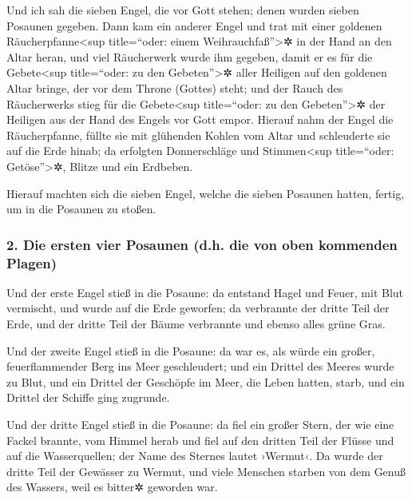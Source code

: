  Und ich sah die sieben Engel, die vor Gott stehen; denen
wurden sieben Posaunen gegeben.  Dann kam ein anderer
Engel und trat mit einer goldenen Räucherpfanne\textless sup
title=``oder: einem Weihrauchfaß''\textgreater✲ in der Hand an den Altar
heran, und viel Räucherwerk wurde ihm gegeben, damit er es für die
Gebete\textless sup title=``oder: zu den Gebeten''\textgreater✲ aller
Heiligen auf den goldenen Altar bringe, der vor dem Throne (Gottes)
steht;  und der Rauch des Räucherwerks stieg für die
Gebete\textless sup title=``oder: zu den Gebeten''\textgreater✲ der
Heiligen aus der Hand des Engels vor Gott empor.  Hierauf
nahm der Engel die Räucherpfanne, füllte sie mit glühenden Kohlen vom
Altar und schleuderte sie auf die Erde hinab; da erfolgten Donnerschläge
und Stimmen\textless sup title=``oder: Getöse''\textgreater✲, Blitze und
ein Erdbeben.

 Hierauf machten sich die sieben Engel, welche die sieben
Posaunen hatten, fertig, um in die Posaunen zu stoßen.

\hypertarget{die-ersten-vier-posaunen-d.h.-die-von-oben-kommenden-plagen}{%
\subsubsection{2. Die ersten vier Posaunen (d.h. die von oben kommenden
Plagen)}\label{die-ersten-vier-posaunen-d.h.-die-von-oben-kommenden-plagen}}

 Und der erste Engel stieß in die Posaune: da entstand
Hagel und Feuer, mit Blut vermischt, und wurde auf die Erde geworfen; da
verbrannte der dritte Teil der Erde, und der dritte Teil der Bäume
verbrannte und ebenso alles grüne Gras.

 Und der zweite Engel stieß in die Posaune: da war es, als
würde ein großer, feuerflammender Berg ins Meer geschleudert; und ein
Drittel des Meeres wurde zu Blut,  und ein Drittel der
Geschöpfe im Meer, die Leben hatten, starb, und ein Drittel der Schiffe
ging zugrunde.

 Und der dritte Engel stieß in die Posaune: da fiel ein
großer Stern, der wie eine Fackel brannte, vom Himmel herab und fiel auf
den dritten Teil der Flüsse und auf die Wasserquellen; 
der Name des Sternes lautet ›Wermut‹. Da wurde der dritte Teil der
Gewässer zu Wermut, und viele Menschen starben von dem Genuß des
Wassers, weil es bitter✲ geworden war.

